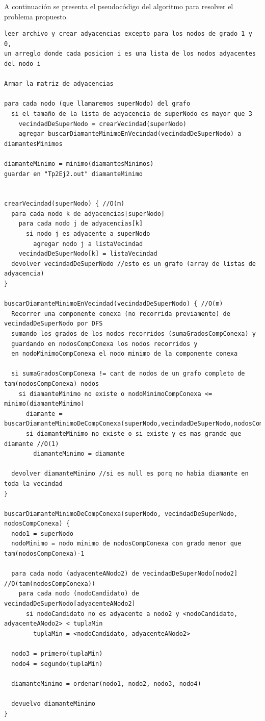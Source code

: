 \documentclass[a4paper,11pt] {article}
\begin{document}
A continuaci\'on se presenta el pseudoc\'odigo del algoritmo para resolver el problema propuesto.

\begin{verbatim}
leer archivo y crear adyacencias excepto para los nodos de grado 1 y 0,
un arreglo donde cada posicion i es una lista de los nodos adyacentes del nodo i

Armar la matriz de adyacencias

para cada nodo (que llamaremos superNodo) del grafo
  si el tamaño de la lista de adyacencia de superNodo es mayor que 3
    vecindadDeSuperNodo = crearVecindad(superNodo)
    agregar buscarDiamanteMinimoEnVecindad(vecindadDeSuperNodo) a diamantesMinimos

diamanteMinimo = minimo(diamantesMinimos)
guardar en "Tp2Ej2.out" diamanteMinimo


crearVecindad(superNodo) { //O(m)
  para cada nodo k de adyacencias[superNodo]
    para cada nodo j de adyacencias[k]
      si nodo j es adyacente a superNodo
        agregar nodo j a listaVecindad
    vecindadDeSuperNodo[k] = listaVecindad
  devolver vecindadDeSuperNodo //esto es un grafo (array de listas de adyacencia)
}

buscarDiamanteMinimoEnVecindad(vecindadDeSuperNodo) { //O(m)
  Recorrer una componente conexa (no recorrida previamente) de vecindadDeSuperNodo por DFS 
  sumando los grados de los nodos recorridos (sumaGradosCompConexa) y
  guardando en nodosCompConexa los nodos recorridos y
  en nodoMinimoCompConexa el nodo minimo de la componente conexa
  
  si sumaGradosCompConexa != cant de nodos de un grafo completo de tam(nodosCompConexa) nodos
    si diamanteMinimo no existe o nodoMinimoCompConexa <= minimo(diamanteMinimo)
      diamante = buscarDiamanteMinimoDeCompConexa(superNodo,vecindadDeSuperNodo,nodosCompConexa)
      si diamanteMinimo no existe o si existe y es mas grande que diamante //O(1)
        diamanteMinimo = diamante

  devolver diamanteMinimo //si es null es porq no habia diamante en toda la vecindad
}

buscarDiamanteMinimoDeCompConexa(superNodo, vecindadDeSuperNodo, nodosCompConexa) {
  nodo1 = superNodo
  nodoMinimo = nodo minimo de nodosCompConexa con grado menor que tam(nodosCompConexa)-1

  para cada nodo (adyacenteANodo2) de vecindadDeSuperNodo[nodo2] //O(tam(nodosCompConexa))
    para cada nodo (nodoCandidato) de vecindadDeSuperNodo[adyacenteANodo2]
      si nodoCandidato no es adyacente a nodo2 y <nodoCandidato, adyacenteANodo2> < tuplaMin
        tuplaMin = <nodoCandidato, adyacenteANodo2>

  nodo3 = primero(tuplaMin)
  nodo4 = segundo(tuplaMin)

  diamanteMinimo = ordenar(nodo1, nodo2, nodo3, nodo4)

  devuelvo diamanteMinimo
}

\end{verbatim}
\end{document}
